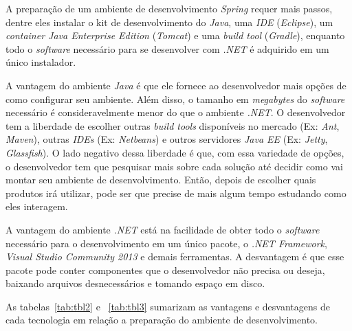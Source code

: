 A preparação de um ambiente de desenvolvimento \textit{Spring} requer mais passos, dentre eles instalar o kit de desenvolvimento do \textit{Java}, uma \textit{IDE} (\textit{Eclipse}), um \textit{container Java Enterprise Edition} (\textit{Tomcat}) e uma \textit{build tool} (\textit{Gradle}), enquanto  todo o \textit{software} necessário para se desenvolver com \textit{.NET} é adquirido em um único instalador.

A vantagem do ambiente \textit{Java} é que ele fornece ao desenvolvedor mais opções de como configurar seu ambiente. Além disso, o tamanho em \textit{megabytes} do \textit{software} necessário é consideravelmente menor do que o ambiente \textit{.NET}. O desenvolvedor tem a liberdade de escolher outras \textit{build tools} disponíveis no mercado (Ex: \textit{Ant}, \textit{Maven}), outras \textit{IDEs} (Ex: \textit{Netbeans}) e outros servidores \textit{Java EE} (Ex: \textit{Jetty}, \textit{Glassfish}). O lado negativo dessa liberdade é que, com  essa variedade de opções, o desenvolvedor tem que pesquisar mais sobre cada solução até decidir como vai montar seu ambiente de desenvolvimento. Então, depois de escolher quais produtos irá utilizar, pode ser que precise de mais algum tempo estudando como eles interagem.

A vantagem do ambiente \textit{.NET} está na facilidade de obter todo o \textit{software} necessário para o desenvolvimento em um único pacote, o \textit{.NET Framework}, \textit{Visual Studio Community 2013} e demais ferramentas. A desvantagem é que esse pacote pode conter componentes que o desenvolvedor não precisa ou deseja, baixando arquivos desnecessários e tomando espaço em disco.

As tabelas~\ref{tab:tbl2} e ~\ref{tab:tbl3} sumarizam as vantagens e desvantagens de cada tecnologia em relação a preparação do ambiente de desenvolvimento.

\begin{table}[h!]   
    \centering
\end{table}

